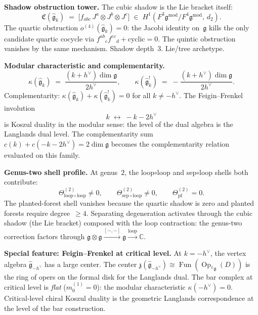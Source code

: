 \documentclass[11pt]{report}
\theoremstyle{definition}
\theoremstyle{remark}
\numberwithin{equation}{section}
\begin{document}
\medskip
\noindent\textbf{Shadow obstruction tower.}
The cubic shadow is the Lie bracket itself:
\[
\mathfrak C(\widehat{\mathfrak g}_k)
\;=\;
\bigl[f_{abc}\,J^a\otimes J^b\otimes J^c\bigr]
\;\in\;
H^1(F^3\mathfrak g^{\mathrm{mod}}/F^4\mathfrak g^{\mathrm{mod}},\,d_2).
\]
The quartic obstruction $o^{(4)}(\widehat{\mathfrak g}_k)=0$: the
Jacobi identity on~$\mathfrak g$ kills the only candidate quartic
cocycle via $f^{ab}{}_e f^{ec}{}_d+\text{cyclic}=0$. The quintic
obstruction vanishes by the same mechanism. Shadow depth~$3$.
Lie/tree archetype.

\medskip
\noindent\textbf{Modular characteristic and complementarity.}
\[
\kappa(\widehat{\mathfrak g}_k)
\;=\;
\frac{(k+h^\vee)\dim\mathfrak g}{2h^\vee},
\qquad
\kappa(\widehat{\mathfrak g}_k^!)
\;=\;
-\frac{(k+h^\vee)\dim\mathfrak g}{2h^\vee}.
\]
Complementarity: $\kappa(\widehat{\mathfrak g}_k)+
\kappa(\widehat{\mathfrak g}_k^!)=0$ for all $k\neq -h^\vee$.
The Feigin--Frenkel involution
\[
k\;\longleftrightarrow\; -k-2h^\vee
\]
is Koszul duality in the modular sense: the level of the dual algebra
is the Langlands dual level. The complementarity sum $c(k)+c(-k-2h^\vee)=2\dim\mathfrak g$
becomes the complementarity relation evaluated on this family.

\medskip
\noindent\textbf{Genus-two shell profile.}
At genus~$2$, the loop$\circ$loop and sep$\circ$loop shells both
contribute:
\[
\Theta^{(2)}_{\mathrm{loop}\circ\mathrm{loop}}\neq 0,
\qquad
\Theta^{(2)}_{\mathrm{sep}\circ\mathrm{loop}}\neq 0,
\qquad
\Theta^{(2)}_{\mathrm{pf}}= 0.
\]
The planted-forest shell vanishes because the quartic shadow is zero
and planted forests require degree~$\ge 4$. Separating degeneration
activates through the cubic shadow (the Lie bracket) composed with
the loop contraction: the genus-two correction factors through
$\mathfrak g \otimes \mathfrak g \xrightarrow{[-,-]}
\mathfrak g \xrightarrow{\mathrm{loop}} \mathbb C$.

\medskip
\noindent\textbf{Special feature: Feigin--Frenkel at critical level.}
At $k=-h^\vee$, the vertex algebra
$\widehat{\mathfrak g}_{-h^\vee}$ has a large center.
The center $\mathfrak z(\widehat{\mathfrak g}_{-h^\vee})
\cong \operatorname{Fun}(\operatorname{Op}_{{}^L\mathfrak g}(D))$
is the ring of opers on the formal disk for the Langlands dual. The
bar complex at critical level is \emph{flat} ($m_0^{(1)}=0$): the
modular characteristic $\kappa(-h^\vee)=0$. Critical-level chiral
Koszul duality is the geometric Langlands correspondence at the
level of the bar construction.
\end{document}
